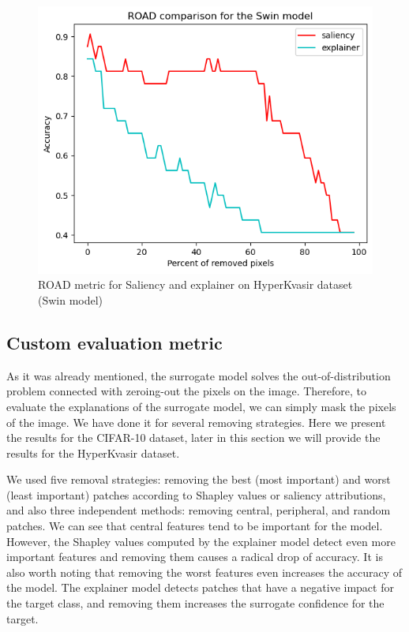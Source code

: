 \documentclass[magisterska,en]{pracamgr}
\begin{document}
\begin{figure}[H]
\centering
\includegraphics[scale=0.5]{./images/ROAD_gastro_swin.png}
\caption{ROAD metric for Saliency and explainer on HyperKvasir dataset (Swin model)}
\label{ROAD_gastro_swin}
\end{figure}










\subsection{Custom evaluation metric}

As it was already mentioned, the surrogate model solves the out-of-distribution problem connected with zeroing-out the pixels on the image. Therefore, to evaluate the explanations of the surrogate model, we can simply mask the pixels of the image. We have done it for several removing strategies. Here we present the results for the CIFAR-10 dataset, later in this section we will provide the results for the HyperKvasir dataset.




We used five removal strategies: removing the best (most important) and worst (least important) patches according to Shapley values or saliency attributions, and also three independent methods: removing central, peripheral, and random patches. We can see that central features tend to be important for the model. However, the Shapley values computed by the explainer model detect even more important features and removing them causes a radical drop of accuracy. It is also worth noting that removing the worst features even increases the accuracy of the model. The explainer model detects patches that have a negative impact for the target class, and removing them increases the surrogate confidence for the target.
\end{document}
